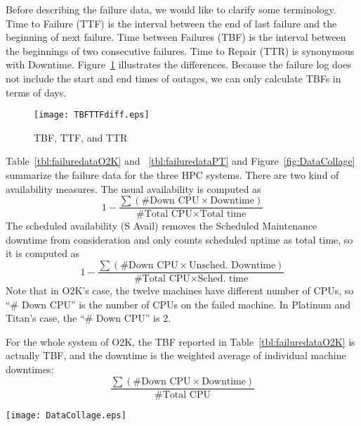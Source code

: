 \documentclass[10pt,twocolumn]{article}
\begin{document}
\label{s:prelim}
Before describing the failure data, we would like to clarify some 
terminology. Time to Failure (TTF) is the interval between the 
end of last failure and the beginning of next failure.  
Time between Failures (TBF) is the interval between the 
beginnings of two consecutive failures. Time to Repair (TTR) 
is synonymous with Downtime. Figure~\ref{fig:TBFTTFdiff} 
illustrates the differences. Because the failure log does not 
include the start and end times of outages, we can only 
calculate TBFs in terms of days.

\begin{figure}[h]
   \begin{center}
   \texttt{[image: TBFTTFdiff.eps]} 
    \caption{TBF, TTF, and TTR}
    \label{fig:TBFTTFdiff}
   \end{center}
\end{figure}

Table~\ref{tbl:failuredataO2K} and ~\ref{tbl:failuredataPT} 
and Figure~\ref{fig:DataCollage} summarize the failure data 
for the three HPC systems. There are two kind of availability 
measures. The usual availability is computed as
\[
1 - \frac{\sum (\mbox{\# Down CPU} \times \mbox{Downtime})}{\mbox{\# Total CPU} \times \mbox{Total time}}
\]
The scheduled availability (S Avail) removes the 
Scheduled Maintenance downtime from consideration
and only counts scheduled uptime as total time, so
it is computed as
\[
1 - \frac{\sum (\mbox{\# Down CPU} \times \mbox{Unsched. Downtime})}{\mbox{\# Total CPU} \times \mbox{Sched. time}}
\]
Note that in O2K's case, the twelve machines have different 
number of CPUs, so ``\# Down CPU'' is the number of CPUs on the 
failed machine. In Platinum and Titan's case, the 
``\# Down CPU'' is 2. 

For the whole system of O2K, the TBF reported in 
Table~\ref{tbl:failuredataO2K} is actually TBF, and the 
downtime is the weighted average of individual machine 
downtimes:
\[
\frac{\sum ( \mbox{\# Down CPU} \times \mbox{Downtime} ) }{\mbox{\# Total CPU}}
\]

\begin{figure*}
   \begin{center}
   \texttt{[image: DataCollage.eps]} 
    \caption{The rows from top to bottom depict weekly Availability, Outages, 
     Downtime, and Failure Clustering (see \S\ref{s:corr}), 
     respectively. The X axis in all plots is week. The Y axis in 
     Downtime row is CPU-hours and in Failure Clustering row, the number
     of machines/nodes involved.}
    \label{fig:DataCollage}
   \end{center}
\end{figure*}
\end{document}
